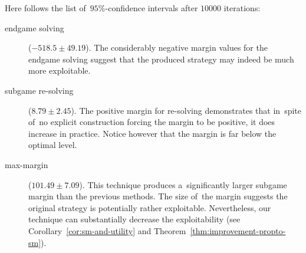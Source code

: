 Here follows the list of~$95\%$-confidence intervals after $10000$ iterations:
\begin{description}
  \item[endgame solving] ($-518.5 \pm 49.19$).
    The considerably negative margin values for the endgame solving suggest that the produced strategy may indeed be much more exploitable.

  \item[subgame re-solving] ($8.79 \pm 2.45$).
    The positive margin for re-solving demonstrates that in~spite of~no explicit construction forcing the margin to be positive, it does increase in practice. 
    Notice however that the margin is far below the optimal level.

  \item[max-margin] ($101.49 \pm 7.09$).
    This technique produces a~significantly larger subgame margin than the previous methods.
    The size of~the margin suggests the original strategy is potentially rather exploitable.
    Nevertheless, our technique can substantially decrease the exploitability (see Corollary~\ref{cor:sm-and-utility} and Theorem~\ref{thm:improvement-propto-sm}).
\end{description}
